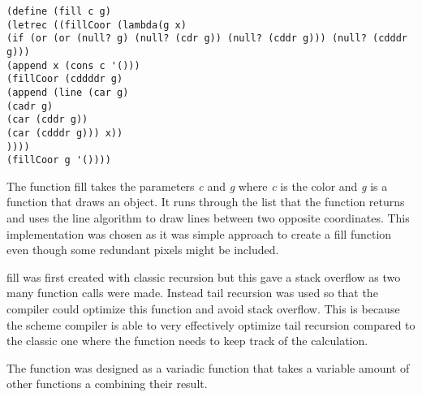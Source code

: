 \begin{lstlisting}[caption={Scheme function fill}, label=lst:fill]
(define (fill c g)
(letrec ((fillCoor (lambda(g x)
(if (or (or (null? g) (null? (cdr g)) (null? (cddr g))) (null? (cdddr g)))
(append x (cons c '()))
(fillCoor (cddddr g)
(append (line (car g)
(cadr g)
(car (cddr g))
(car (cdddr g))) x))
))))
(fillCoor g '())))
\end{lstlisting}

The function fill takes the parameters \emph{c} and \emph{g} where \emph{c} is the color and \emph{g} is a function that draws an object. It runs through the list that the function returns and uses the line algorithm to draw lines between two opposite coordinates. This implementation was chosen as it was simple approach to create a fill function even though some redundant pixels might be included. 

fill was first created with classic recursion but this gave a stack overflow as two many function calls were made. Instead tail recursion was used so that the compiler could optimize this function and avoid stack overflow.  This is because the scheme compiler is able to very effectively optimize tail recursion compared to the classic one where the function needs to keep track of the calculation.



The function was designed as a variadic function that takes a variable amount of other functions a combining their result.

